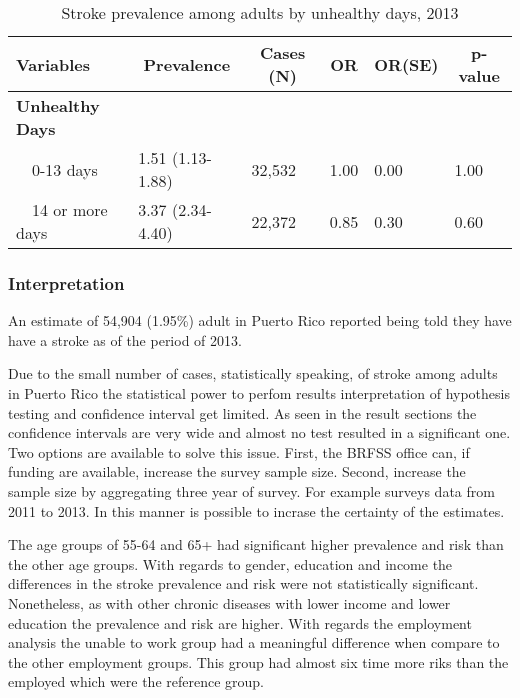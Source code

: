\begin{table}[H]
\caption{Stroke prevalence among adults by unhealthy days, 2013\label{tab:unhlthy.Stroke.2013}} 
\begin{center}
\begin{tabular}{llllll}
\hline\hline
\multicolumn{1}{l}{Variables}&\multicolumn{1}{c}{Prevalence}&\multicolumn{1}{c}{Cases (N)}&\multicolumn{1}{c}{OR}&\multicolumn{1}{c}{OR(SE)}&\multicolumn{1}{c}{p-value}\tabularnewline
\hline
{\bfseries Unhealthy Days}&&&&&\tabularnewline
~~0-13 days&1.51 (1.13-1.88)&32,532&1.00&0.00&1.00\tabularnewline
~~14 or more days&3.37 (2.34-4.40)&22,372&0.85&0.30&0.60\tabularnewline
\hline
\end{tabular}\end{center}

\end{table}

\newpage
 \subsubsection{Interpretation}

An estimate of 54,904 
(1.95\%) adult in Puerto Rico reported being told they have have a stroke as of the period of 2013. 

Due to the small number of cases, statistically speaking, of stroke among adults in Puerto Rico the statistical power to perfom results interpretation of hypothesis testing and confidence interval get limited.  As seen in the result sections the confidence intervals are very wide and almost no test resulted in a significant one.  Two options are available to solve this issue. First, the BRFSS office can, if funding are available, increase the survey sample size. Second, increase the sample size by aggregating three year of survey.  For example surveys data from 2011 to 2013.  In this manner is possible to incrase the certainty of the estimates.


The age groups of 55-64 and 65+ had significant higher prevalence and risk than the other age groups. With regards to gender, education and income the differences in the stroke prevalence and risk were not statistically significant.  Nonetheless, as with other chronic diseases with lower income and lower education the prevalence and risk are higher.  With regards the employment analysis the unable to work group had a meaningful difference when compare to the other employment groups. This group had almost six time more riks than the employed which were the reference group.


